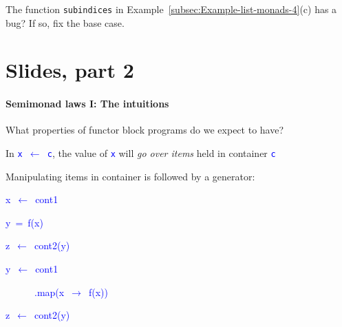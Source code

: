 The function \lstinline!subindices! in Example~\ref{subsec:Example-list-monads-4}(c)
has a bug? If so, fix the base case.

\section{Slides, part 2}

\paragraph{Semimonad laws I: The intuitions}

What properties of functor block programs do we expect to have?

In \texttt{\textcolor{blue}{\footnotesize{}x $\leftarrow$ c}}, the
value of \texttt{\textcolor{blue}{\footnotesize{}x}} will \emph{go
over items} held in container \texttt{\textcolor{blue}{\footnotesize{}c}} 

Manipulating items in container is followed by a generator:

\texttt{\textcolor{blue}{\footnotesize{}}}%
\begin{minipage}[c][1\totalheight][t]{0.49\columnwidth}%
\begin{lyxcode}
\textcolor{blue}{\footnotesize{}x~$\leftarrow$~cont1}{\footnotesize\par}

\textcolor{blue}{\footnotesize{}y~=~f(x)}{\footnotesize\par}

\textcolor{blue}{\footnotesize{}z~$\leftarrow$~cont2(y)}{\footnotesize\par}
\end{lyxcode}
%
\end{minipage}\texttt{\textcolor{blue}{\footnotesize{}\hfill{}}}%
\begin{minipage}[c][1\totalheight][t]{0.4\columnwidth}%
\begin{lyxcode}
\textcolor{blue}{\footnotesize{}y~$\leftarrow$~cont1}{\footnotesize\par}

\textcolor{blue}{\footnotesize{}~~~~~~.map(x~$\rightarrow$~f(x))}{\footnotesize\par}

\textcolor{blue}{\footnotesize{}z~$\leftarrow$~cont2(y)}{\footnotesize\par}
\end{lyxcode}
%
\end{minipage}\texttt{\textcolor{blue}{\footnotesize{}\hfill{}\medskip{}
}}{\footnotesize\par}

